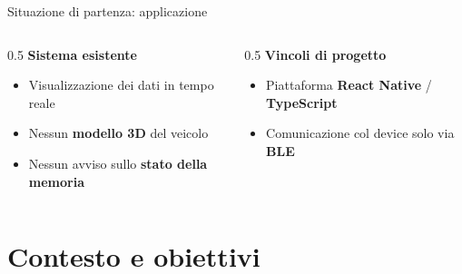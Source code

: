 \documentclass[aspectratio=169]{beamer}
\begin{document}
\begin{frame}{Situazione di partenza: applicazione}
  \begin{columns}[T,onlytextwidth]
    \begin{column}{0.5\textwidth}
      {\color{padovared}\textbf{Sistema esistente}}
      \begin{itemize}
        \item Visualizzazione dei dati in tempo reale
        \item Nessun \textbf{modello 3D} del veicolo
        \item Nessun avviso sullo \textbf{stato della memoria}
      \end{itemize}
    \end{column}
    \begin{column}{0.5\textwidth}
      {\color{padovapetrol}\textbf{Vincoli di progetto}}
      \begin{itemize}
        \item Piattaforma \textbf{React Native} / \textbf{TypeScript}
        \item Comunicazione col device solo via \textbf{BLE}
      \end{itemize}
    \end{column}
  \end{columns}
\end{frame}

\section{Contesto e obiettivi}
\end{document}
